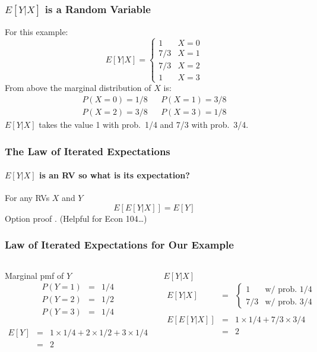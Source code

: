 \documentclass[handout]{beamer}
\begin{document}
\begin{frame}
\frametitle{$E[Y|X]$ is a Random Variable}
For this example:
	$$E[Y|X]= \left\{\begin{array}{cc}  
	1& X = 0\\
	7/3& X = 1\\
	7/3& X = 2\\ 
	1& X = 3 
	\end{array}\right.$$ 
From above the marginal distribution of $X$ is:
	\begin{eqnarray*}
		P(X=0)= 1/8 && P(X=1) = 3/8\\
		P(X=2)=3/8 && P(X=3)=1/8
	\end{eqnarray*} 
\alert{$E[Y|X]$ takes the value 1 with prob.\ 1/4 and 7/3 with prob.\ 3/4.}

\end{frame}
\begin{frame}
\frametitle{The Law of Iterated Expectations}
\framesubtitle{$E[Y|X]$ is an RV so what is its expectation?}
For any RVs $X$ and $Y$
	$$\boxed{E\left[E\left[Y|X  \right]  \right] = E[Y]}$$
Option proof \textcolor{blue}{\href{http://ditraglia.com/Econ103Public/OptionalProofs.pdf}{}}.
(Helpful for Econ 104\dots)


\end{frame}
\begin{frame}[t]
\frametitle{Law of Iterated Expectations for Our Example}

\begin{columns}
\footnotesize
{}
\begin{block}{Marginal pmf of $Y$}
\begin{eqnarray*}
	P(Y = 1) &=& 1/4 \\
	P(Y = 2) &=& 1/2\\
	P(Y = 3) &=& 1/4
\end{eqnarray*}


\begin{eqnarray*}
	E[Y] &=& 1\times 1/4 + 2 \times 1/2 + 3 \times 1/4\\
		&=&2
\end{eqnarray*}
\end{block}

\begin{block}{$E[Y|X]$}
	\begin{eqnarray*}
	 E[Y|X] &=& \left\{\begin{array}{cc} 1& \mbox{w/ prob. } 1/4\\ 7/3& \mbox{w/ prob. } 3/4\end{array}\right.\\\\ 
	 E\left[E\left[Y|X \right] \right] &=& 1 \times 1/4 + 7/3 \times 3/4\\ 
	 &=& 2
	\end{eqnarray*}
	\vspace{1em}
\end{block}

\end{columns}

\end{frame}
\end{document}
